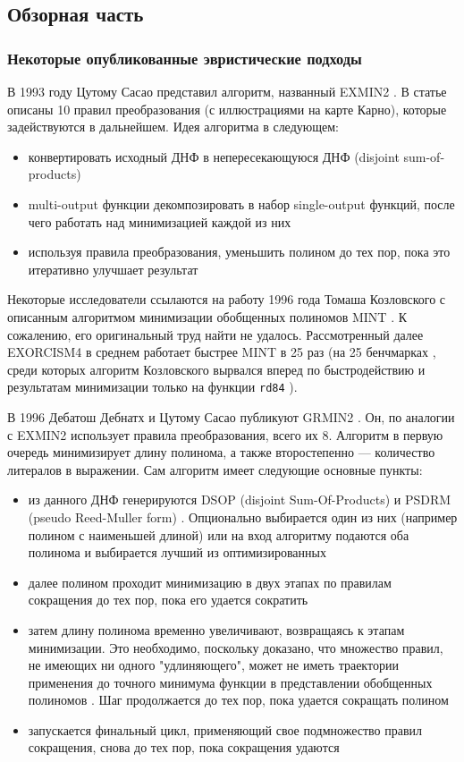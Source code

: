 \documentclass[a4paper,12pt,titlepage,finall]{article}
\begin{document}
\subsection{Обзорная часть}

\subsubsection*{Некоторые опубликованные эвристические подходы}

В 1993 году Цутому Сасао представил алгоритм, названный \textsc{EXMIN2} \cite{exmin2}.
В статье описаны 10 правил преобразования (с иллюстрациями на карте Карно), которые задействуются в дальнейшем. Идея алгоритма в следующем:
\begin{itemize}
    \item конвертировать исходный ДНФ в непересекающуюся ДНФ (disjoint sum-of-products)
    \item multi-output функции декомпозировать в набор single-output функций, после чего работать над минимизацией каждой из них
    \item используя правила преобразования, уменьшить полином до тех пор, пока это итеративно улучшает результат
\end{itemize}

Некоторые исследователи ссылаются на работу 1996 года Томаша Козловского с описанным алгоритмом минимизации обобщенных полиномов \textsc{MINT} \cite{mint}. К сожалению, его оригинальный труд найти не удалось. Рассмотренный далее \textsc{EXORCISM4} в среднем работает быстрее \textsc{MINT} в 25 раз (на 25 бенчмарках \cite{exorcism4}, среди которых алгоритм Козловского вырвался вперед по быстродействию и результатам минимизации только на функции \texttt{rd84} \cite{benchmark}).

В 1996 Дебатош Дебнатх и Цутому Сасао публикуют GRMIN2 \cite{grmin2}.
Он, по аналогии с \textsc{EXMIN2} использует правила преобразования, всего их 8. Алгоритм в первую очередь минимизирует длину полинома, а также второстепенно --- количество литералов в выражении. Сам алгоритм имеет следующие основные пункты:
\begin{itemize}
    \item из данного ДНФ генерируются DSOP (disjoint Sum-Of-Products) \cite{exmin2} и PSDRM (pseudo Reed-Muller form) \cite{psdrm}. Опционально выбирается один из них (например полином с наименьшей длиной) или на вход алгоритму подаются оба полинома и выбирается лучший из оптимизированных
    \item далее полином проходит минимизацию в двух этапах по правилам сокращения до тех пор, пока его удается сократить
    \item затем длину полинома временно увеличивают, возвращаясь к этапам минимизации. Это необходимо, поскольку доказано, что множество правил, не имеющих ни одного "удлиняющего", может не иметь траектории применения до точного минимума функции в представлении обобщенных полиномов \cite{convergence}. Шаг продолжается до тех пор, пока удается сокращать полином
    \item запускается финальный цикл, применяющий свое подмножество правил сокращения, снова до тех пор, пока сокращения удаются
\end{itemize}
\end{document}
